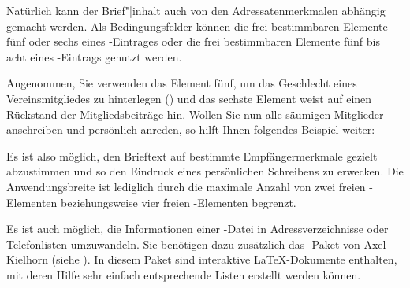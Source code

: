 Natürlich kann der Brief"|inhalt auch von den Adressatenmerkmalen
abhängig gemacht werden. Als Bedingungsfelder können die frei
bestimmbaren Elemente fünf oder sechs eines
-Eintrages oder die frei bestimmbaren
Elemente fünf bis acht eines -Eintrags
genutzt werden.
\begin{Example}
  Angenommen, Sie verwenden das Element fünf, um das Geschlecht eines
  Vereinsmitgliedes zu hinterlegen () und das sechste
  Element weist auf einen Rückstand der Mitgliedsbeiträge hin. Wollen
  Sie nun alle säumigen Mitglieder anschreiben und persönlich anreden,
  so hilft Ihnen folgendes Beispiel weiter:
\begin{lstcode}
  \renewcommand*{\adrentry}[8]{
    \ifdim #6pt>0pt\relax
      \begin{letter}{#2 #1\\#3}
        \if #5m \opening{Lieber #2,} \fi
        \if #5w \opening{Liebe #2,} \fi

        Leider mussten wir feststellen, dass du mit 
        der Zahlung deiner Mitgliedsbeiträge im 
        Rückstand bist.

        Wir möchten Dich bitten, den offenen Betrag 
        von #6~EUR auf das Vereinskonto einzuzahlen.
        \closing{Petri Heil,}
      \end{letter}
    \fi
  }
\end{lstcode}
\end{Example}
Es ist also möglich, den Brieftext auf bestimmte Empfängermerkmale
gezielt abzustimmen und so den Eindruck eines persönlichen
Schreibens zu erwecken. Die Anwendungsbreite ist lediglich durch
die maximale Anzahl von zwei freien -Elementen
beziehungsweise vier freien -Elementen
begrenzt.


\begin{Declaration}
\end{Declaration}
%
Es ist auch möglich, die Informationen einer -Datei in
Adressverzeichnisse oder Telefonlisten umzuwandeln. Sie benötigen dazu
zusätzlich das -Paket von Axel Kielhorn
(siehe \cite{package:adrconv}). In diesem Paket sind interaktive
\LaTeX-Dokumente enthalten, mit deren Hilfe sehr einfach entsprechende Listen
erstellt werden können.

